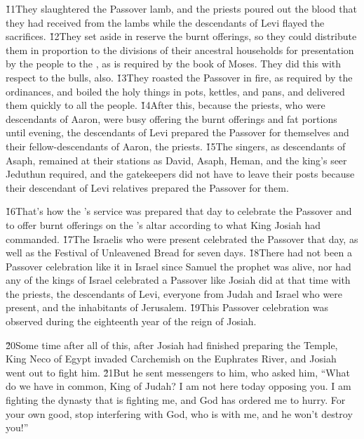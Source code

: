 \v{11}They slaughtered the Passover lamb, and the priests poured out the blood that they had received from the lambs while the descendants of Levi flayed the sacrifices. \v{12}They set aside in reserve the burnt offerings, so they could distribute them in proportion to the divisions of their ancestral households for presentation by the people to the , as is required by the book of Moses. They did this with respect to the bulls, also. \v{13}They roasted the Passover in fire, as required by the ordinances, and boiled the holy things in pots, kettles, and pans, and delivered them quickly to all the people. \v{14}After this, because the priests, who were descendants of Aaron, were busy offering the burnt offerings and fat portions until evening, the descendants of Levi prepared the Passover for themselves and their fellow-descendants of Aaron, the priests. \v{15}The singers, as descendants of Asaph, remained at their stations as David, Asaph, Heman, and the king's seer Jeduthun required, and the gatekeepers did not have to leave their posts because their descendant of Levi relatives prepared the Passover for them.

\v{16}That's how the 's service was prepared that day to celebrate the Passover and to offer burnt offerings on the 's altar according to what King Josiah had commanded. \v{17}The Israelis who were present celebrated the Passover that day, as well as the Festival of Unleavened Bread for seven days. \v{18}There had not been a Passover celebration like it in Israel since Samuel the prophet was alive, nor had any of the kings of Israel celebrated a Passover like Josiah did at that time with the priests, the descendants of Levi, everyone from Judah and Israel who were present, and the inhabitants of Jerusalem. \v{19}This Passover celebration was observed during the eighteenth year of the reign of Josiah.

\v{20}Some time after all of this, after Josiah had finished preparing the Temple, King Neco of Egypt invaded Carchemish on the Euphrates River, and Josiah went out to fight him. \v{21}But he sent messengers to him, who asked him, ``What do we have in common, King of Judah? I am not here today opposing you. I am fighting the dynasty that is fighting me, and God has ordered me to hurry. For your own good, stop interfering with God, who is with me, and he won't destroy you!''


